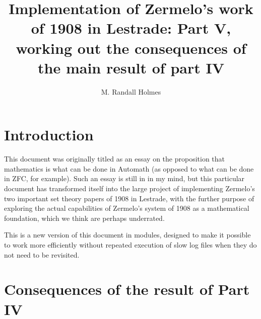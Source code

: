 \documentclass[12pt]{article}
\title{Implementation of Zermelo's work of 1908 in Lestrade:  Part V, working out the consequences of the main result of part IV}
\author{M. Randall Holmes}
\begin{document}
\maketitle

\section{Introduction}
 
This document was originally titled as an essay on the proposition that mathematics is what can be done in Automath (as opposed to what can be done in ZFC, for example).  Such an essay is still in in my mind, but this particular document has transformed itself into the large project of implementing Zermelo's two important set theory papers of 1908 in Lestrade, with the further purpose of exploring the actual capabilities of Zermelo's system of 1908 as a mathematical foundation, which we think are perhaps underrated.

This is a new version of this document in modules, designed to make it possible to work more efficiently without repeated execution of slow log files when they do not need to be revisited.

\section{Consequences of the result of Part IV}
\end{document}
